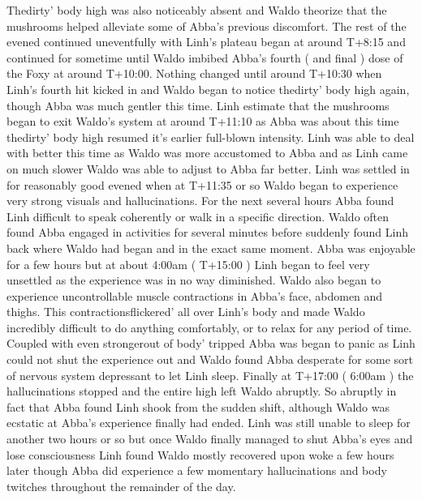 \documentclass[12pt]{book}
\begin{document}
Thedirty' body high was also noticeably absent and Waldo theorize that the mushrooms helped alleviate some of Abba's previous discomfort. The rest of the evened continued uneventfully with Linh's plateau began at around T+8:15 and continued for sometime until Waldo imbibed Abba's fourth ( and final ) dose of the Foxy at around T+10:00. Nothing changed until around T+10:30 when Linh's fourth hit kicked in and Waldo began to notice thedirty' body high again, though Abba was much gentler this time. Linh estimate that the mushrooms began to exit Waldo's system at around T+11:10 as Abba was about this time thedirty' body high resumed it's earlier full-blown intensity. Linh was able to deal with better this time as Waldo was more accustomed to Abba and as Linh came on much slower Waldo was able to adjust to Abba far better. Linh was settled in for reasonably good evened when at T+11:35 or so Waldo began to experience very strong visuals and hallucinations. For the next several hours Abba found Linh difficult to speak coherently or walk in a specific direction. Waldo often found Abba engaged in activities for several minutes before suddenly found Linh back where Waldo had began and in the exact same moment. Abba was enjoyable for a few hours but at about 4:00am ( T+15:00 ) Linh began to feel very unsettled as the experience was in no way diminished. Waldo also began to experience uncontrollable muscle contractions in Abba's face, abdomen and thighs. This contractionsflickered' all over Linh's body and made Waldo incredibly difficult to do anything comfortably, or to relax for any period of time. Coupled with even strongerout of body' tripped Abba was began to panic as Linh could not shut the experience out and Waldo found Abba desperate for some sort of nervous system depressant to let Linh sleep. Finally at T+17:00 ( 6:00am ) the hallucinations stopped and the entire high left Waldo abruptly. So abruptly in fact that Abba found Linh shook from the sudden shift, although Waldo was ecstatic at Abba's experience finally had ended. Linh was still unable to sleep for another two hours or so but once Waldo finally managed to shut Abba's eyes and lose consciousness Linh found Waldo mostly recovered upon woke a few hours later though Abba did experience a few momentary hallucinations and body twitches throughout the remainder of the day.
\end{document}
